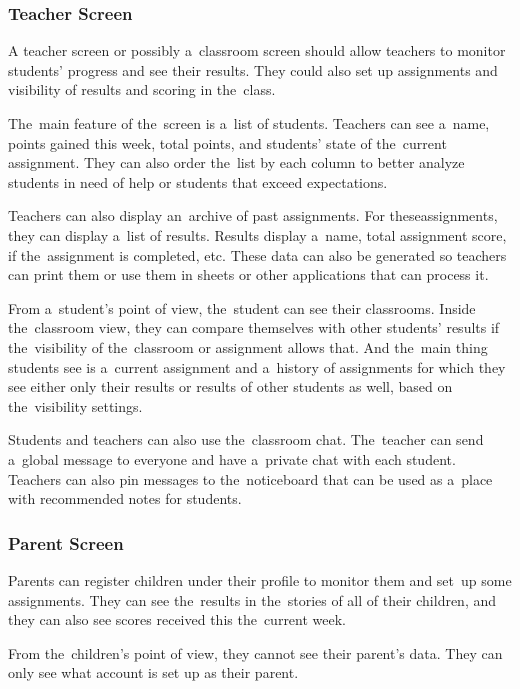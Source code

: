 \subsubsection{Teacher Screen}

A teacher screen or possibly a~classroom screen should allow teachers to monitor students' progress and see their results.
They could also set up assignments and visibility of results and scoring in the~class.

The~main feature of the~screen is a~list of students.
Teachers can see a~name, points gained this week, total points, and students' state of the~current assignment.
They can also order the~list by each column to better analyze students in need of help or students that exceed expectations.

Teachers can also display an~archive of past assignments.
For these\linebreak{}assignments, they can display a~list of results.
Results display a~name, \mbox{total} assignment score, if the~assignment is completed, etc.
These data can also be generated so teachers can print them or use them in sheets or other applications that can process it.

From a~student's point of view, the~student can see their classrooms.
Inside the~classroom view, they can compare themselves with other students' results if the~visibility of the~classroom or assignment allows that.
And the~main thing students see is a~current assignment and a~history of assignments for which they see either only their results or results of other students as well, based on the~visibility settings.

Students and teachers can also use the~classroom chat.
The~teacher can send a~global message to everyone and have a~private chat with each student.
Teachers can also pin messages to the~noticeboard that can be used as a~place with recommended notes for students.

\subsubsection{Parent Screen}

Parents can register children under their profile to monitor them and set~up some assignments.
They can see the~results in the~stories of all of their \mbox{children}, and they can also see scores received this the~current week.

From the~children's point of view, they cannot see their parent's data.
They can only see what account is set up as their parent.

